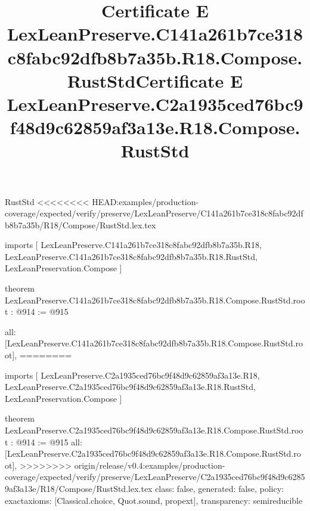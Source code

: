 \begin{lexlean}{RustStd}
<<<<<<<< HEAD:examples/production-coverage/expected/verify/preserve/LexLeanPreserve/C141a261b7ce318c8fabc92dfb8b7a35b/R18/Compose/RustStd.lex.tex
\title{Certificate E LexLeanPreserve.C141a261b7ce318c8fabc92dfb8b7a35b.R18.Compose.RustStd}
\begin{coremodule}
imports [
  LexLeanPreserve.C141a261b7ce318c8fabc92dfb8b7a35b.R18,
  LexLeanPreserve.C141a261b7ce318c8fabc92dfb8b7a35b.R18.RustStd,
  LexLeanPreservation.Compose
]

theorem LexLeanPreserve.C141a261b7ce318c8fabc92dfb8b7a35b.R18.Compose.RustStd.root : @914 := @915 {
  all: [LexLeanPreserve.C141a261b7ce318c8fabc92dfb8b7a35b.R18.Compose.RustStd.root],
========
\title{Certificate E LexLeanPreserve.C2a1935ced76bc9f48d9c62859af3a13e.R18.Compose.RustStd}
\begin{coremodule}
imports [
  LexLeanPreserve.C2a1935ced76bc9f48d9c62859af3a13e.R18,
  LexLeanPreserve.C2a1935ced76bc9f48d9c62859af3a13e.R18.RustStd,
  LexLeanPreservation.Compose
]

theorem LexLeanPreserve.C2a1935ced76bc9f48d9c62859af3a13e.R18.Compose.RustStd.root : @914 := @915 {
  all: [LexLeanPreserve.C2a1935ced76bc9f48d9c62859af3a13e.R18.Compose.RustStd.root],
>>>>>>>> origin/release/v0.4:examples/production-coverage/expected/verify/preserve/LexLeanPreserve/C2a1935ced76bc9f48d9c62859af3a13e/R18/Compose/RustStd.lex.tex
  class: false,
  generated: false,
  policy: exact{axioms: [Classical.choice, Quot.sound, propext]},
  transparency: semireducible
}


\end{coremodule}}
\end{coremodule}
\end{lexlean}

